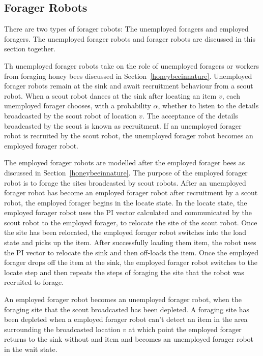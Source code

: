 \subsection{Forager Robots}

There are two types of forager robots: The unemployed foragers and employed foragers. The unemployed forager robots and forager robots are discussed in this section together.

Th unemployed forager robots take on the role of unemployed foragers or workers from foraging honey bees discussed in Section~\ref{honeybeeinnature}. Unemployed forager robots remain at the sink and await recruitment behaviour from a scout robot. When a scout robot dances at the sink after locating an item $v$, each unemployed forager chooses, with a probability $\alpha$, whether to listen to the details broadcasted by the scout robot of location $v$. The acceptance of the details broadcasted by the scout is known as recruitment. If an unemployed forager robot is recruited by the scout robot, the unemployed forager robot becomes an employed forager robot.

The employed forager robots are modelled after the employed forager bees as discussed in Section~\ref{honeybeeinnature}. The purpose of the employed forager robot is to forage the sites broadcasted by scout robots. After an unemployed forager robot has become an employed forager robot after recruitment by a scout robot, the employed forager begins in the locate state. In the locate state, the employed forager robot uses the PI vector calculated and communicated by the scout robot to the employed forager, to relocate the site of the scout robot. Once the site has been relocated, the employed forager robot switches into the load state and picks up the item. After successfully loading them item, the robot uses the PI vector to relocate the sink and then off-loads the item. Once the employed forager drops off the item at the sink, the employed forager robot switches to the locate step and then repeats the steps of foraging the site that the robot was recruited to forage. 

An employed forager robot becomes an unemployed forager robot, when the foraging site that the scout broadcasted has been depleted. A foraging site has been depleted when a employed forager robot can't detect an item in the area surrounding the broadcasted location $v$ at which point the employed forager returns to the sink without and item and becomes an unemployed forager robot in the wait state. 

